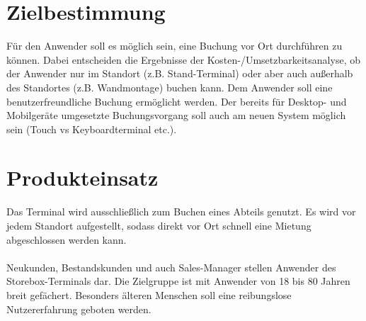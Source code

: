 
\section{Zielbestimmung}
Für den Anwender soll es möglich sein, eine Buchung vor Ort durchführen zu können. Dabei entscheiden die Ergebnisse der Kosten-/Umsetzbarkeitsanalyse, ob der Anwender nur im Standort (z.B. Stand-Terminal) oder aber auch außerhalb des Standortes (z.B. Wandmontage) buchen kann. Dem Anwender soll eine benutzerfreundliche Buchung ermöglicht werden. Der bereits für Desktop- und Mobilgeräte umgesetzte Buchungsvorgang soll auch am neuen System möglich sein (Touch vs Keyboardterminal etc.). 

\section{Produkteinsatz}
Das Terminal wird ausschließlich zum Buchen eines Abteils genutzt. Es wird vor jedem Standort aufgestellt, sodass direkt vor Ort schnell eine Mietung abgeschlossen werden kann.
\\
\\
Neukunden, Bestandskunden und auch Sales-Manager stellen Anwender des Storebox-Terminals dar. Die Zielgruppe ist mit Anwender von 18 bis 80 Jahren breit gefächert. Besonders älteren Menschen soll eine reibungslose Nutzererfahrung geboten werden.